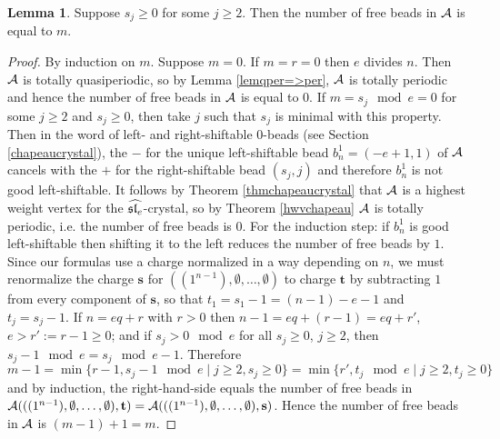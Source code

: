 \documentclass[12pt]{amsart}
\numberwithin{equation}{section}
\theoremstyle{definition}
\newtheorem{lemma}[equation]{Lemma}
\newcommand{\emp}{\emptyset}
\newcommand{\mbs}{\mathbf{s}}
\newcommand{\mbt}{\mathbf{t}}
\begin{document}
\begin{lemma}\label{lem6.2} Suppose $s_j\geq 0$ for some $j\geq 2$. Then the number of free beads in $\mathcal{A}$ is equal to $m$. 
\end{lemma}
\begin{proof}
By induction on $m$. Suppose $m=0$. If $m=r=0$ then $e$ divides $n$. Then $\mathcal{A}$ is totally quasiperiodic, so by Lemma \ref{lemqper=>per}, $\mathcal{A}$ is totally periodic and hence the number of free beads in $\mathcal{A}$ is equal to $0$. If $m=s_j\mod e=0$ for some $j\geq 2$ and $s_j\geq 0$, then take $j$ such that $s_j$ is minimal with this property. Then in the word of left- and right-shiftable $0$-beads (see Section \ref{chapeaucrystal}), the $-$ for the unique left-shiftable bead $b_n^1=(-e+1,1)$ of $\mathcal{A}$ cancels with the $+$ for the right-shiftable bead $(s_j,j)$ and therefore $b_n^1$ is not good left-shiftable. It follows by Theorem \ref{thmchapeaucrystal} that $\mathcal{A}$ is a highest weight vertex for the $\widehat{\mathfrak{sl}_e}$-crystal, so by Theorem \ref{hwvchapeau} $\mathcal{A}$ is totally periodic, i.e. the number of free beads is $0$. 
For the induction step: if $b_n^1$ is good left-shiftable then shifting it to the left reduces the number of free beads by $1$. Since our formulas use a charge normalized in a way depending on $n$, we must renormalize the charge $\mbs$ for $((1^{n-1}),\emp,\dots,\emp)$ to charge $\mbt$ by subtracting $1$ from every component of $\mbs$, so that $t_1=s_1-1=(n-1)-e-1$ and $t_j=s_j-1$. If $n=eq+r$ with $r>0$ then $n-1=eq+(r-1)=eq+r'$, $e>r':=r-1\geq 0$; and if $s_j>0 \mod e$ for all $s_j\geq 0$, $j\geq 2$, then $s_j-1 \mod e= s_j\mod e -1$. Therefore $$m-1=\min\{r-1,s_j-1\mod e\mid j\geq 2, s_j\geq 0\}=\min\{r', t_j\mod e\mid j\geq 2, t_j\geq 0\}$$ and by induction, the right-hand-side equals the number of free beads in $\cA(((1^{n-1}),\emp,\dots,\emp),\mbt)=\cA(((1^{n-1}),\emp,\dots,\emp),\mbs)$. Hence the number of free beads in $\mathcal{A}$ is $(m-1)+1=m$.
\end{proof}
\end{document}
